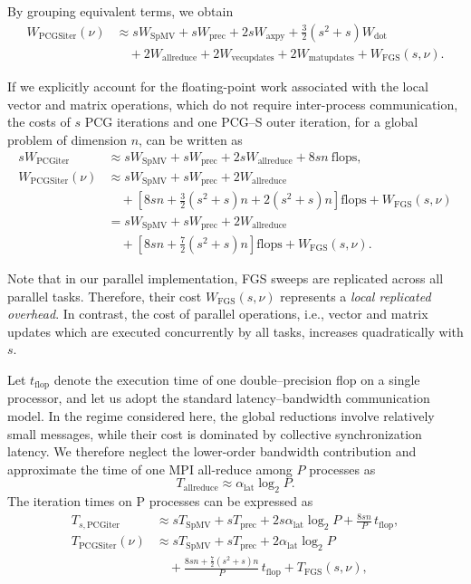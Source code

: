 \documentclass[pdflatex,sn-mathphys-num]{sn-jnl}%
\begin{document}
By grouping equivalent terms, we obtain
\begin{align*}
W_{\mathrm{PCGSiter}}(\nu)
&\approx
sW_{\mathrm{SpMV}}
+sW_{\mathrm{prec}}
+2sW_{\mathrm{axpy}}
+\frac{3}{2}(s^2+s)W_{\mathrm{dot}}
\\
&\quad
+2W_{\mathrm{allreduce}}
+2W_{\mathrm{vecupdates}}
+2W_{\mathrm{matupdates}}
+W_{\mathrm{FGS}}(s,\nu).
\end{align*}


If we explicitly account for the floating-point work associated with
the local vector and matrix operations, which do not require
inter-process communication, the costs of $s$ PCG iterations and one
PCG--S outer iteration, for a global problem of dimension $n$, can be
written as
\begin{align*}
sW_{\mathrm{PCGiter}}
&\approx
sW_{\mathrm{SpMV}}
+sW_{\mathrm{prec}}
+2sW_{\mathrm{allreduce}}
+8sn\ \mathrm{flops},
\\[4pt]
W_{\mathrm{PCGSiter}}(\nu)
&\approx
sW_{\mathrm{SpMV}}
+sW_{\mathrm{prec}}
+2W_{\mathrm{allreduce}}
\\
&\quad
+\left[
8sn
+\frac{3}{2}(s^2+s)n
+2(s^2+s)n
\right]\mathrm{flops}
+W_{\mathrm{FGS}}(s,\nu)
\\
&=
sW_{\mathrm{SpMV}}
+sW_{\mathrm{prec}}
+2W_{\mathrm{allreduce}}
\\
&\quad
+\left[
8sn+\frac{7}{2}(s^2+s)n
\right]\mathrm{flops}
+W_{\mathrm{FGS}}(s,\nu).
\end{align*}

Note that in our parallel implementation, FGS sweeps are replicated across all parallel tasks.
Therefore, their cost \( W_{\mathrm{FGS}}(s,\nu) \) represents a \emph{local replicated overhead}.
In contrast, the cost of parallel operations, i.e., vector and matrix updates which are executed concurrently by all tasks, increases quadratically with \(s\).

Let \( t_{\mathrm{flop}} \) denote the execution time of one double--precision flop on a single processor,
and let us adopt the standard latency--bandwidth communication model. In the
regime considered here, the global reductions involve relatively
small messages, while their cost is dominated by collective
synchronization latency. We therefore neglect the lower-order
bandwidth contribution and approximate the time of one MPI
all-reduce among $P$ processes as
\[
T_{\mathrm{allreduce}}
\approx
\alpha_{\mathrm{lat}}\log_2P.
\]
The iteration times on P processes can be expressed as
\begin{align*}
T_{s,\mathrm{PCGiter}}
&\approx
sT_{\mathrm{SpMV}}
+sT_{\mathrm{prec}}
+2s\alpha_{\mathrm{lat}}\log_2P
+\frac{8sn}{P}\,t_{\mathrm{flop}},
\\[4pt]
T_{\mathrm{PCGSiter}}(\nu)
&\approx
sT_{\mathrm{SpMV}}
+sT_{\mathrm{prec}}
+2\alpha_{\mathrm{lat}}\log_2P
\\
&\quad
+\frac{
8sn+\tfrac{7}{2}(s^2+s)n
}{P}\,t_{\mathrm{flop}}
+T_{\mathrm{FGS}}(s,\nu),
\end{align*}
\end{document}
